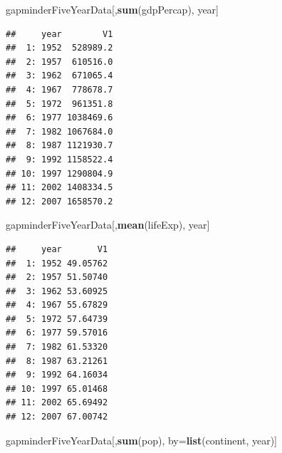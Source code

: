 \documentclass[]{article}
\newenvironment{Shaded}{\begin{snugshade}}{\end{snugshade}}
\newcommand{\KeywordTok}[1]{\textcolor[rgb]{0.13,0.29,0.53}{\textbf{{#1}}}}
\newcommand{\NormalTok}[1]{{#1}}
\begin{document}
\begin{Shaded}
\begin{Highlighting}[]
\NormalTok{gapminderFiveYearData[,}\KeywordTok{sum}\NormalTok{(gdpPercap), year]}
\end{Highlighting}
\end{Shaded}

\begin{verbatim}
##     year        V1
##  1: 1952  528989.2
##  2: 1957  610516.0
##  3: 1962  671065.4
##  4: 1967  778678.7
##  5: 1972  961351.8
##  6: 1977 1038469.6
##  7: 1982 1067684.0
##  8: 1987 1121930.7
##  9: 1992 1158522.4
## 10: 1997 1290804.9
## 11: 2002 1408334.5
## 12: 2007 1658570.2
\end{verbatim}

\begin{Shaded}
\begin{Highlighting}[]
\NormalTok{gapminderFiveYearData[,}\KeywordTok{mean}\NormalTok{(lifeExp), year]}
\end{Highlighting}
\end{Shaded}

\begin{verbatim}
##     year       V1
##  1: 1952 49.05762
##  2: 1957 51.50740
##  3: 1962 53.60925
##  4: 1967 55.67829
##  5: 1972 57.64739
##  6: 1977 59.57016
##  7: 1982 61.53320
##  8: 1987 63.21261
##  9: 1992 64.16034
## 10: 1997 65.01468
## 11: 2002 65.69492
## 12: 2007 67.00742
\end{verbatim}

\begin{Shaded}
\begin{Highlighting}[]
\NormalTok{gapminderFiveYearData[,}\KeywordTok{sum}\NormalTok{(pop), by=}\KeywordTok{list}\NormalTok{(continent, year)]}
\end{Highlighting}
\end{Shaded}
\end{document}
